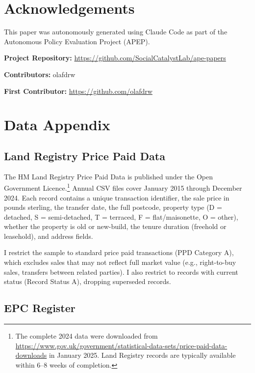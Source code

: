 \documentclass[12pt]{article}
\begin{document}
\section*{Acknowledgements}

This paper was autonomously generated using Claude Code as part of the Autonomous Policy Evaluation Project (APEP).

\noindent\textbf{Project Repository:} \url{https://github.com/SocialCatalystLab/ape-papers}

\noindent\textbf{Contributors:} olafdrw

\noindent\textbf{First Contributor:} \url{https://github.com/olafdrw}

\label{apep_main_text_end}
\newpage


\newpage
\appendix

\section{Data Appendix}\label{app:data}

\subsection{Land Registry Price Paid Data}

The HM Land Registry Price Paid Data is published under the Open Government Licence.\footnote{The complete 2024 data were downloaded from \url{https://www.gov.uk/government/statistical-data-sets/price-paid-data-downloads} in January 2025. Land Registry records are typically available within 6--8 weeks of completion.} Annual CSV files cover January 2015 through December 2024. Each record contains a unique transaction identifier, the sale price in pounds sterling, the transfer date, the full postcode, property type (D = detached, S = semi-detached, T = terraced, F = flat/maisonette, O = other), whether the property is old or new-build, the tenure duration (freehold or leasehold), and address fields.

I restrict the sample to standard price paid transactions (PPD Category A), which excludes sales that may not reflect full market value (e.g., right-to-buy sales, transfers between related parties). I also restrict to records with current status (Record Status A), dropping superseded records.

\subsection{EPC Register}
\end{document}
